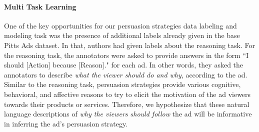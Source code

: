 \begin{table}[t]
    \small
        \centering
        \caption{\small Effect of different Modalities and Tasks on the accuracy and performance of the strategy prediction task.}
        \label{tab:modalities}
    \end{table}

\paragraph{Multi Task Learning}
One of the key opportunities for our persuasion strategies data labeling and modeling task was the presence of additional labels already given in the base Pitts Ads dataset. In that, authors had given labels about the reasoning task. For the reasoning task, the annotators were asked to provide answers in the form ``I should [Action] because [Reason]." for each ad. In other words, they asked the annotators to describe \textit{what the viewer should do and why}, according to
the ad. Similar to the reasoning task, persuasion strategies provide various cognitive, behavioral, and affective reasons to try to elicit the motivation of the ad viewers towards their products or services. Therefore, we hypothesize that these natural language descriptions of \textit{why the viewers should follow} the ad will be informative in inferring the ad's persuasion strategy.

